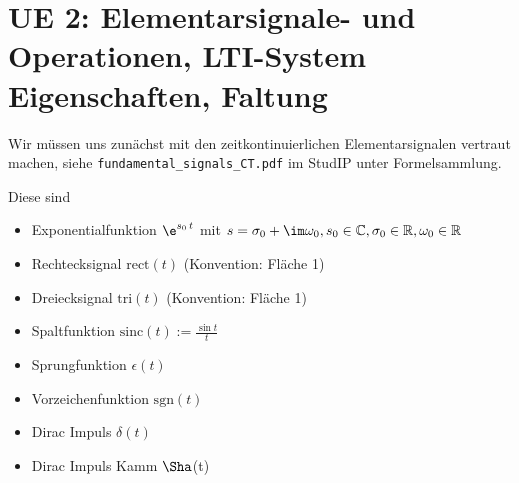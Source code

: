 \newpage
\section{UE 2: Elementarsignale- und Operationen, LTI-System Eigenschaften, Faltung}
\label{sec:ue2_faltung}

Wir müssen uns zunächst mit den zeitkontinuierlichen Elementarsignalen vertraut
machen, siehe \verb|fundamental_signals_CT.pdf| im StudIP unter Formelsammlung.

Diese sind
\begin{itemize}
  \item Exponentialfunktion
  $\e^{s_0 \, t}$ mit $s=\sigma_0 + \im\omega_0, s_0\in\mathbb{C}, \sigma_0\in\mathbb{R}, \omega_0\in\mathbb{R}$
  \item Rechtecksignal $\mathrm{rect}(t)$ (Konvention: Fläche 1)
  \item Dreiecksignal $\mathrm{tri}(t)$  (Konvention: Fläche 1)
  \item Spaltfunktion $\mathrm{sinc}(t):=\frac{\sin t}{t}$
  \item Sprungfunktion $\epsilon(t)$
  \item Vorzeichenfunktion $\mathrm{sgn}(t)$
  \item Dirac Impuls $\delta(t)$
  \item Dirac Impuls Kamm $\Sha$(t)
\end{itemize}








\newpage
